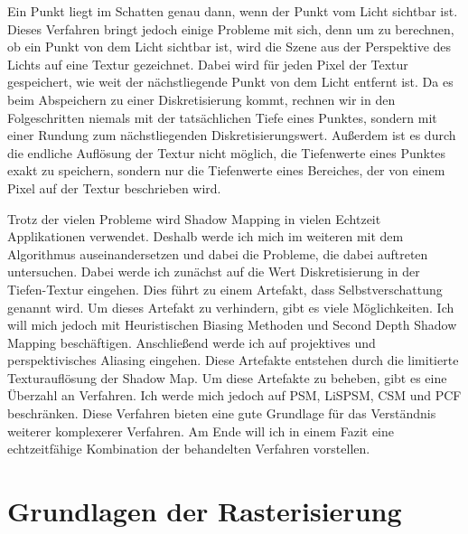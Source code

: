 Ein Punkt liegt im Schatten genau dann, wenn der Punkt vom Licht sichtbar ist.
Dieses Verfahren bringt jedoch einige Probleme mit sich, denn um zu berechnen, ob ein Punkt von dem Licht sichtbar ist,
wird die Szene aus der Perspektive des Lichts auf eine Textur gezeichnet.
Dabei wird für jeden Pixel der Textur gespeichert, wie weit der nächstliegende Punkt von dem Licht entfernt ist.
Da es beim Abspeichern zu einer Diskretisierung kommt, 
rechnen wir in den Folgeschritten niemals mit der tatsächlichen Tiefe eines Punktes,
sondern mit einer Rundung zum nächstliegenden Diskretisierungswert.
Außerdem ist es durch die endliche Auflösung der Textur nicht möglich, die Tiefenwerte eines Punktes exakt zu speichern,
sondern nur die Tiefenwerte eines Bereiches, der von einem Pixel auf der Textur beschrieben wird.
\par
Trotz der vielen Probleme wird Shadow Mapping in vielen Echtzeit Applikationen verwendet.
Deshalb werde ich mich im weiteren mit dem Algorithmus auseinandersetzen und dabei die Probleme, die dabei auftreten untersuchen.
Dabei werde ich zunächst auf die Wert Diskretisierung in der Tiefen-Textur eingehen.
Dies führt zu einem Artefakt, dass Selbstverschattung genannt wird. 
Um dieses Artefakt zu verhindern, gibt es viele Möglichkeiten. 
Ich will mich jedoch mit Heuristischen Biasing Methoden und Second Depth Shadow Mapping beschäftigen.
Anschließend werde ich auf projektives und perspektivisches Aliasing eingehen. 
Diese Artefakte entstehen durch die limitierte Texturauflösung der Shadow Map.
Um diese Artefakte zu beheben, gibt es eine Überzahl an Verfahren. Ich werde mich jedoch auf PSM, LiSPSM, CSM und PCF beschränken.
Diese Verfahren bieten eine gute Grundlage für das Verständnis weiterer komplexerer Verfahren.
Am Ende will ich in einem Fazit eine echtzeitfähige Kombination der behandelten Verfahren vorstellen.



\chapter{Grundlagen der Rasterisierung}

